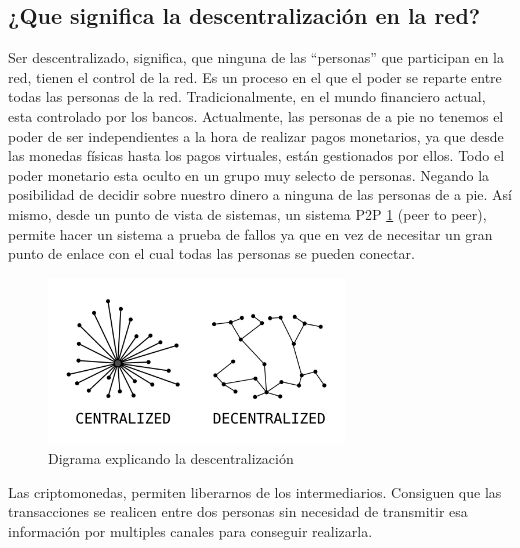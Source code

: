 \subsection{¿Que significa la descentralización en la red?}
Ser descentralizado, significa, que ninguna de las “personas” que participan en la red, tienen el control de la red. Es un proceso en el que el poder se reparte entre todas las personas de la red. Tradicionalmente, en el mundo financiero actual, esta controlado por los bancos. Actualmente, las personas de a pie no tenemos el poder de ser independientes a la hora de realizar pagos monetarios, ya que desde las monedas físicas hasta los pagos virtuales, están gestionados por ellos. Todo el poder monetario esta oculto en un grupo muy selecto de personas. Negando la posibilidad de decidir sobre nuestro dinero a ninguna de las personas de a pie.
Así mismo, desde un punto de vista de sistemas, un sistema P2P \ref{fg:decentralization_diagram} (peer to peer), permite hacer un sistema a prueba de fallos ya que en vez de necesitar un gran punto de enlace con el cual todas las personas se pueden conectar.
\begin{figure}[h!]
    \centering
    \includegraphics[width=0.7\textwidth]{Figures/Decentralization_diagram.png}
    \caption{Digrama explicando la descentralización}
    \label{fg:decentralization_diagram}
\end{figure}
Las criptomonedas, permiten liberarnos de los intermediarios. Consiguen que las transacciones se realicen entre dos personas sin necesidad de transmitir esa información por multiples canales para conseguir realizarla.
